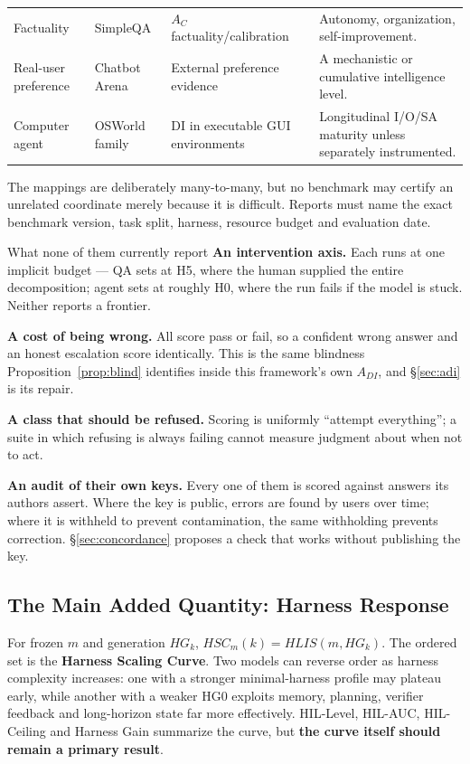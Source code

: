 \documentclass[11pt]{article}
\theoremstyle{definition}
\begin{document}
\begin{table}[h]
\begin{tabularx}{\textwidth}{@{}lZZZ@{}}
Factuality & SimpleQA & $A_C$ factuality/calibration & Autonomy, organization, self-improvement. \\
Real-user preference & Chatbot Arena & External preference evidence & A mechanistic or cumulative intelligence level. \\
Computer agent & OSWorld family & DI in executable GUI environments & Longitudinal I/O/SA maturity unless separately instrumented. \\
\bottomrule
\end{tabularx}
\end{table}

The mappings are deliberately many-to-many, but no benchmark may certify an unrelated coordinate merely because it is difficult. Reports must name the exact benchmark version, task split, harness, resource budget and evaluation date.

\begin{claimbox}{What none of them currently report}
\textbf{An intervention axis.} Each runs at one implicit budget --- QA sets at H5, where the human supplied the entire decomposition; agent sets at roughly H0, where the run fails if the model is stuck. Neither reports a frontier.

\textbf{A cost of being wrong.} All score pass or fail, so a confident wrong answer and an honest escalation score identically. This is the same blindness Proposition~\ref{prop:blind} identifies inside this framework's own $A_{DI}$, and \S\ref{sec:adi} is its repair.

\textbf{A class that should be refused.} Scoring is uniformly ``attempt everything''; a suite in which refusing is always failing cannot measure judgment about when not to act.

\textbf{An audit of their own keys.} Every one of them is scored against answers its authors assert. Where the key is public, errors are found by users over time; where it is withheld to prevent contamination, the same withholding prevents correction. \S\ref{sec:concordance} proposes a check that works without publishing the key.
\end{claimbox}

\subsection{The Main Added Quantity: Harness Response}

For frozen $m$ and generation $HG_k$, $HSC_m(k) = HLIS(m,HG_k)$. The ordered set is the \textbf{Harness Scaling Curve}. Two models can reverse order as harness complexity increases: one with a stronger minimal-harness profile may plateau early, while another with a weaker HG0 exploits memory, planning, verifier feedback and long-horizon state far more effectively. HIL-Level, HIL-AUC, HIL-Ceiling and Harness Gain summarize the curve, but \textbf{the curve itself should remain a primary result}.
\end{document}
